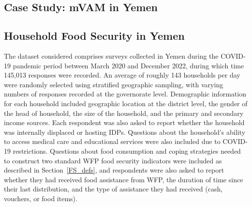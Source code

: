 \subsection{Case Study: mVAM in Yemen}



\subsection{Household Food Security in Yemen}

The dataset considered comprises surveys collected in Yemen during the COVID-19 pandemic period between March 2020 and December 2022, during which time 145,013 responses were recorded. An average of roughly 143 households per day were randomly selected using stratified geographic sampling, with varying numbers of responses recorded at the governorate level. Demographic information for each household included geographic location at the district level, the gender of the head of household, the size of the household, and the primary and secondary income sources. Each respondent was also asked to report whether the household was internally displaced or hosting IDPs. Questions about the household's ability to access medical care and educational services were also included due to COVID-19 restrictions. Questions about food consumption and coping strategies needed to construct two standard WFP food security indicators were included as described in Section~\ref{FS_defs}, and respondents were also asked to report whether they had received food assistance from WFP, the duration of time since their last distribution, and the type of assistance they had received (cash, vouchers, or food items).    

